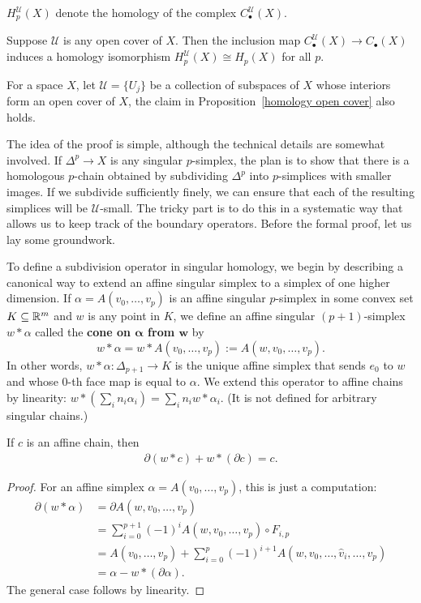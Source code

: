 $H^\mathcal{U}_p(X)$ denote the homology of the complex $C^\mathcal{U}_\bullet(X)$.
\begin{proposition}\label{homology open cover}
Suppose $\mathcal{U}$ is any open cover of $X$. Then the inclusion map $C^\mathcal{U}_\bullet(X)\to C_\bullet(X)$ induces a homology isomorphism $H_p^\mathcal{U}(X)\cong H_p(X)$ for all $p$.
\end{proposition}
\begin{remark}
For a space $X$, let $\mathcal{U}=\{U_j\}$ be a collection of subspaces of $X$ whose interiors form an open cover of $X$, the claim in Proposition~\ref{homology open cover} also holds.
\end{remark}
The idea of the proof is simple, although the technical details are somewhat involved. If $\Delta^p\to X$ is any singular $p$-simplex, the plan is to show that there is a homologous $p$-chain obtained by subdividing $\Delta^p$ into $p$-simplices with smaller images. If we subdivide sufficiently finely, we can ensure that each of the resulting simplices will be $\mathcal{U}$-small. The tricky part is to do this in a systematic way that allows us to keep track of the boundary operators. Before the formal proof, let us lay some groundwork.\par
To define a subdivision operator in singular homology, we begin by describing a canonical way to extend an affine singular simplex to a simplex of one higher dimension. If $\alpha=A(v_0,\dots,v_p)$ is an affine singular $p$-simplex in some convex set $K\subseteq\mathbb{R}^m$ and $w$ is any point in $K$, we define an affine singular $(p+1)$-simplex $w\ast\alpha$ called the \textbf{cone on $\bm{\alpha}$ from $\bm{w}$} by
\[w\ast\alpha=w\ast A(v_0,\dots,v_p):=A(w,v_0,\dots,v_p).\]
In other words, $w\ast\alpha:\Delta_{p+1}\to K$ is the unique affine simplex that sends $e_0$ to $w$ and whose $0$-th face map is equal to $\alpha$. We extend this operator to affine chains by linearity: $w\ast(\sum_i n_i\alpha_i)=\sum_in_iw\ast\alpha_i$. (It is not defined for arbitrary singular
chains.)
\begin{lemma}
If $c$ is an affine chain, then
\begin{align}\label{affine chain sub}
\partial(w\ast c)+w\ast(\partial c)=c.
\end{align}
\end{lemma}
\begin{proof}
For an affine simplex $\alpha=A(v_0,\dots,v_p)$, this is just a computation:
\begin{align*}
\partial(w\ast\alpha)&=\partial A(w,v_0,\dots,v_p)\\
&=\sum_{i=0}^{p+1}(-1)^iA(w,v_0,\dots,v_p)\circ F_{i,p}\\
&=A(v_0,\dots,v_p)+\sum_{i=0}^{p}(-1)^{i+1}A(w,v_0,\dots,\widehat{v}_i,\dots,v_p)\\
&=\alpha-w\ast(\partial\alpha).
\end{align*}
The general case follows by linearity.
\end{proof}
